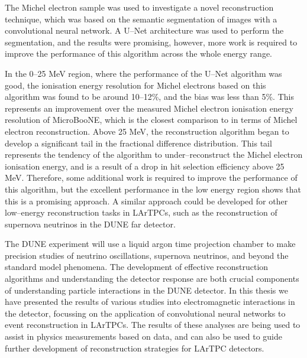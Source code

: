The Michel electron sample was used to investigate a novel reconstruction
technique, which was based on the semantic segmentation of images with a
convolutional neural network. A U--Net architecture was used to perform the
segmentation, and the results were promising, however, more work is required to
improve the performance of this algorithm across the whole energy range. 

In the 0--25 MeV region, where the performance of the U--Net algorithm was 
good, the ionisation energy resolution for Michel electrons based on this 
algorithm was found to be around 10--12\%, and the bias was less than 
5\%. This represents an improvement over the measured Michel electron ionisation
energy resolution of MicroBooNE, which is the closest comparison to \protodune{}
in terms of Michel electron reconstruction. Above 25 MeV, the reconstruction 
algorithm began to develop a significant tail in the fractional difference 
distribution. This tail represents the tendency of the algorithm to 
under--reconstruct the Michel electron ionisation energy, and is a result of a 
drop in hit selection efficiency above 25 MeV. Therefore, some additional work
is required to improve the performance of this algorithm, but the excellent
performance in the low energy region shows that this is a promising approach. A
similar approach could be developed for other low--energy reconstruction tasks
in LArTPCs, such as the reconstruction of supernova neutrinos in the DUNE far
detector.

The DUNE experiment will use a liquid argon time projection chamber to make
precision studies of neutrino oscillations, supernova neutrinos, and beyond the
standard model phenomena. The development of effective reconstruction algorithms
and understanding the detector response are both crucial components of 
understanding particle interactions in the DUNE detector. In this thesis we have
presented the results of various studies into electromagnetic interactions in
the \protodune{} detector, focussing on the application of convolutional neural
networks to event reconstruction in LArTPCs. The results of these analyses are
being used to assist in physics measurements based on \protodune{} data, and can
also be used to guide further development of reconstruction strategies for 
LArTPC detectors.
